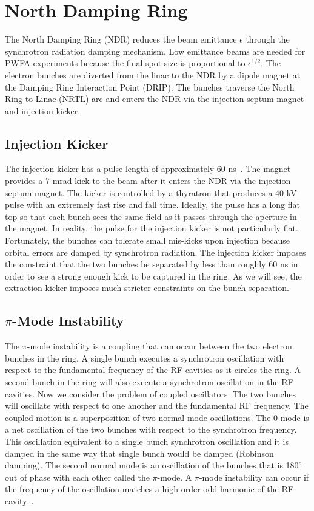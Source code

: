 \documentclass[aps,prl,preprint,groupedaddress]{revtex4-1}
\begin{document}
\section{North Damping Ring}
The North Damping Ring (NDR) reduces the beam emittance $\epsilon$ through the synchrotron radiation damping mechanism. Low emittance beams are needed for PWFA experiments because the final spot size is proportional to $\epsilon^{1/2}$. The electron bunches are diverted from the linac to the NDR by a dipole magnet at the Damping Ring Interaction Point (DRIP). The bunches traverse the North Ring to Linac (NRTL) arc and enters the NDR via the injection septum magnet and injection kicker.  

\subsection{Injection Kicker}
The injection kicker has a pulse length of approximately 60 ns~\cite{kicker}. The magnet provides a 7 mrad kick to the beam after it enters the NDR via the injection septum magnet. The kicker is controlled by a thyratron that produces a 40 kV pulse with an extremely fast rise and fall time. Ideally, the pulse has a long flat top so that each bunch sees the same field as it passes through the aperture in the magnet. In reality, the pulse for the injection kicker is not particularly flat. Fortunately, the bunches can tolerate small mis-kicks upon injection because orbital errors are damped by synchrotron radiation. The injection kicker imposes the constraint that the two bunches be separated by less than roughly 60 ns in order to see a strong enough kick to be captured in the ring. As we will see, the extraction kicker imposes much stricter constraints on the bunch separation.

\subsection{$\pi$-Mode Instability}
The $\pi$-mode instability is a coupling that can occur between the two electron bunches in the ring. A single bunch executes a synchrotron oscillation with respect to the fundamental frequency of the RF cavities as it circles the ring. A second bunch in the ring will also execute a synchrotron oscillation in the RF cavities. Now we consider the problem of coupled oscillators. The two bunches will oscillate with respect to one another and the fundamental RF frequency. The coupled motion is a superposition of two normal mode oscillations. The 0-mode is a net oscillation of the two bunches with respect to the synchrotron frequency. This oscillation equivalent to a single bunch synchrotron oscillation and it is damped in the same way that single bunch would be damped (Robinson damping). The second normal mode is an oscillation of the bunches that is 180$^o$ out of phase with each other called the $\pi$-mode. A $\pi$-mode instability can occur if the frequency of the oscillation matches a high order odd harmonic of the RF cavity~\cite{pi}. 
\end{document}
